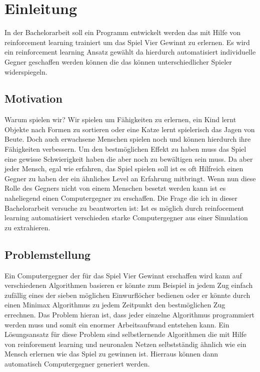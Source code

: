 \chapter{Einleitung}
\label{cha:Einleitung}

In der Bachelorarbeit soll ein Programm entwickelt werden das mit Hilfe von reinforcement learning trainiert um das Spiel Vier Gewinnt zu erlernen. 
Es wird ein reinforcement learning Ansatz gewählt da hierdurch automatisiert individuelle Gegner geschaffen werden können die das können unterschiedlicher Spieler widerspiegeln.%


\section{Motivation}
Warum spielen wir? Wir spielen um Fähigkeiten zu erlernen, ein Kind lernt Objekte nach Formen zu sortieren oder eine Katze lernt spielerisch das Jagen von Beute. Doch auch erwachsene Menschen spielen noch und können hierdurch ihre Fähigkeiten verbessern.  Um den bestmöglichen Effekt zu haben muss das Spiel eine gewisse Schwierigkeit haben die aber noch zu bewältigen sein muss. Da aber jeder Mensch, egal wie erfahren, das Spiel spielen soll ist es oft Hilfreich einen Gegner zu haben der ein ähnliches Level an Erfahrung mitbringt. Wenn nun diese Rolle des Gegners nicht von einem Menschen besetzt werden kann ist es naheliegend einen Computergegner zu erschaffen. Die Frage die ich in dieser Bachelorarbeit versuche zu beantworten ist: Ist es möglich durch reinfocement learning automatisiert verschieden starke Computergegner aus einer Simulation zu extrahieren.


\section{Problemstellung}
Ein Computergegner der für das Spiel Vier Gewinnt erschaffen wird kann auf verschiedenen Algorithmen basieren er könnte zum Beispiel in jedem Zug einfach zufällig eines der sieben möglichen Einwurflöcher bedienen oder er könnte durch einen Minimax Algorithmus zu jedem Zeitpunkt den bestmöglichen Zug errechnen. 
Das Problem hieran ist, dass jeder einzelne Algorithmus programmiert werden muss und somit ein enormer Arbeitsaufwand entstehen kann.
Ein Lösungsansatz für diese Problem sind selbstlernende Algorithmen die mit Hilfe von reinforement learning und neuronalen Netzen selbstständig ähnlich wie ein Mensch erlernen wie das Spiel zu gewinnen ist.
Hierraus können dann automatisch Computergegner generiert werden.

